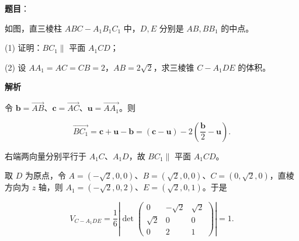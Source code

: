\begin{answer}

\textbf{题目}：

如图，直三棱柱 $ABC-A_1B_1C_1$ 中，$D,E$ 分别是 $AB,BB_1$ 的中点。
\nopagebreak[4]
\begin{center}\end{center}
\nopagebreak[4]
(1) 证明：$BC_1\parallel$ 平面 $A_1CD$；

(2) 设 $AA_1=AC=CB=2$，$AB=2\sqrt2$，求三棱锥 $C-A_1DE$ 的体积。

\textbf{解析}


令 $\boldsymbol b=\overrightarrow{AB}$、$\boldsymbol c=\overrightarrow{AC}$、$\boldsymbol u=\overrightarrow{AA_1}$。则

\nopagebreak[4]
\[\overrightarrow{BC_1}=\boldsymbol c+\boldsymbol u-\boldsymbol b=(\boldsymbol c-\boldsymbol u)-2\left(\frac{\boldsymbol b}{2}-\boldsymbol u\right).\]

右端两向量分别平行于 $A_1C$、$A_1D$，故 $BC_1\parallel$ 平面 $A_1CD$。


取 $D$ 为原点，令 $A=(-\sqrt2,0,0)$、$B=(\sqrt2,0,0)$、$C=(0,\sqrt2,0)$，直棱方向为 $z$ 轴，则 $A_1=(-\sqrt2,0,2)$、$E=(\sqrt2,0,1)$。于是

\nopagebreak[4]
\[V_{C-A_1DE}=\frac16\left|\det\begin{pmatrix}0&-\sqrt2&\sqrt2\\ \sqrt2&0&0\\0&2&1\end{pmatrix}\right|=1.\]



\end{answer}
